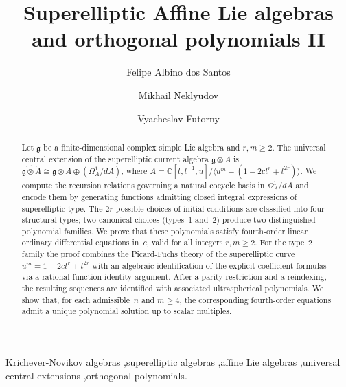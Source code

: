\documentclass[final,nopreprintline]{elsarticle}
\theoremstyle{definition}
\numberwithin{equation}{section}
\theoremstyle{remark}
\begin{document}
\begin{frontmatter}

    \title{Superelliptic Affine Lie algebras and orthogonal polynomials II}

\author[inst1]{Felipe Albino dos Santos}
\author[inst2]{Mikhail Neklyudov}
\author[inst3]{Vyacheslav Futorny}

    \begin{abstract}
Let $\mathfrak{g}$ be a finite-dimensional complex simple Lie algebra and $r,m\ge 2$.
The universal central extension of the superelliptic current algebra
$\mathfrak{g}\otimes A$ is $\widehat{\mathfrak{g}\otimes A}\cong\mathfrak{g}\otimes A
\oplus(\Omega^1_A/dA)$, where $A=\mathbb{C}[t,t^{-1},u]/\langle u^m-(1-2ct^r+t^{2r})\rangle$.
We compute the recursion relations governing a natural cocycle basis in $\Omega^1_A/dA$
and encode them by generating functions admitting closed integral expressions of
superelliptic type. The $2r$ possible choices of initial conditions are classified into
four structural types; two canonical choices (types~1 and~2) produce two distinguished
polynomial families. We prove that these polynomials satisfy fourth-order linear
ordinary differential equations in~$c$, valid for all integers $r,m\ge 2$.
For the type~2 family the proof combines the Picard-Fuchs theory of the
superelliptic curve $u^m=1-2ct^r+t^{2r}$ with an algebraic identification of the
explicit coefficient formulas via a rational-function identity argument.
After a parity restriction and a reindexing, the resulting
sequences are identified with associated ultraspherical polynomials. We show that, for each admissible~$n$ and $m\ge4$, the corresponding fourth-order equations admit a unique polynomial solution up to scalar multiples.
    \end{abstract}

    \begin{keyword}
    	Krichever-Novikov algebras \sep superelliptic algebras \sep affine Lie algebras \sep universal central extensions \sep orthogonal polynomials.
    \end{keyword}

\end{frontmatter}
\end{document}
